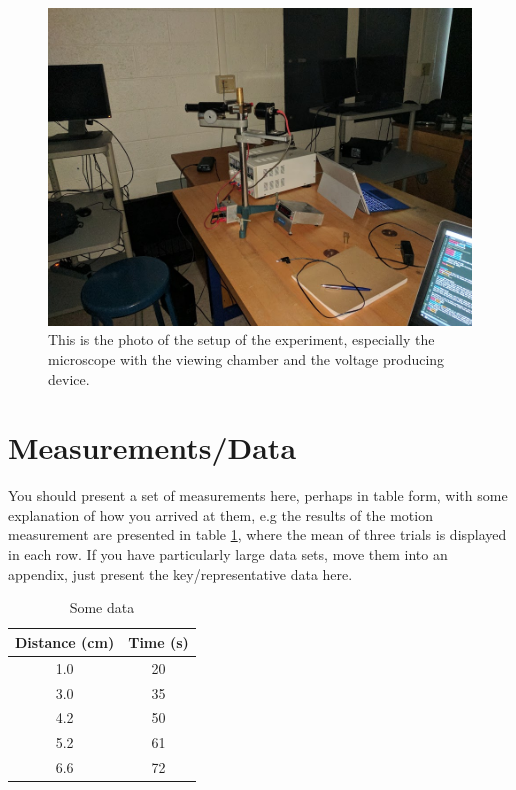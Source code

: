 \documentclass[11pt]{article}
\begin{document}
\begin{figure}[h]
\begin{center}
\includegraphics[scale=0.4]{lab1.jpg}
\caption{This is the photo of the setup of the experiment, especially the microscope with the viewing chamber and the voltage producing device.}
\label{equip}
\end{center}
\end{figure}

\section{Measurements/Data} \label{Measurements}
You should present a set of measurements here, perhaps in table form, with some explanation of how you arrived at them, e.g  the results of the motion measurement are presented in table \ref{table}, where the mean of three trials is displayed in each row.  If you have particularly large data sets, move them into an appendix, just present the key/representative data here.


\begin{table}[htp]
\begin{center}
\begin{tabular}{|c|c|}
 \hline
Distance (cm) & Time (s) \\ \hline
1.0 & 20 \\
3.0 & 35 \\
4.2 & 50 \\
5.2 & 61 \\
6.6 & 72 \\ \hline
\end{tabular}
\caption{Some data}
\end{center}
\label{table}
\end{table}
\end{document}
